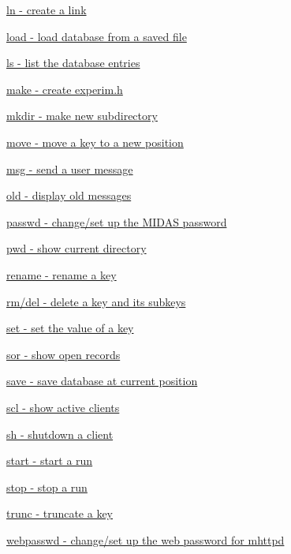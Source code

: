 \begin{DoxyItemize}
\begin{DoxyItemize}
\item \hyperlink{RC_odbedit_examples_RC_odbedit_ln}{ln -\/ create a link} 
\item \hyperlink{RC_odbedit_examples_RC_odbedit_load}{load -\/ load database from a saved file} 
\item \hyperlink{RC_odbedit_examples_RC_odbedit_ls}{ls -\/ list the database entries} 
\item \hyperlink{RC_odbedit_examples_RC_odbedit_make}{make -\/ create experim.h} 
\item \hyperlink{RC_odbedit_examples_RC_odbedit_mkdir}{mkdir -\/ make new subdirectory} 
\item \hyperlink{RC_odbedit_examples_RC_odbedit_move}{move -\/ move a key to a new position} 
\item \hyperlink{RC_odbedit_examples_RC_odbedit_msg}{msg -\/ send a user message} 
\item \hyperlink{RC_odbedit_examples_RC_odbedit_old}{old -\/ display old messages} 
\item \hyperlink{RC_odbedit_examples_RC_odbedit_passwd}{passwd -\/ change/set up the MIDAS password} 
\item \hyperlink{RC_odbedit_examples_RC_odbedit_pwd}{pwd -\/ show current directory} 
\item \hyperlink{RC_odbedit_examples_RC_odbedit_rename}{rename -\/ rename a key} 
\item \hyperlink{RC_odbedit_examples_RC_odbedit_rm}{rm/del -\/ delete a key and its subkeys} 
\item \hyperlink{RC_odbedit_examples_RC_odbedit_set}{set -\/ set the value of a key} 
\item \hyperlink{RC_odbedit_examples_RC_odbedit_sor}{sor -\/ show open records} 
\item \hyperlink{RC_odbedit_examples_RC_odbedit_save}{save -\/ save database at current position} 
\item \hyperlink{RC_odbedit_examples_RC_odbedit_scl}{scl -\/ show active clients} 
\item \hyperlink{RC_odbedit_examples_RC_odbedit_sh}{sh -\/ shutdown a client} 
\item \hyperlink{RC_odbedit_examples_RC_odbedit_start}{start -\/ start a run} 
\item \hyperlink{RC_odbedit_examples_RC_odbedit_stop}{stop -\/ stop a run} 
\item \hyperlink{RC_odbedit_examples_RC_odbedit_trunc}{trunc -\/ truncate a key} 
\item \hyperlink{RC_odbedit_examples_RC_odbedit_webpasswd}{webpasswd -\/ change/set up the web password for mhttpd} 
\end{DoxyItemize}
\end{DoxyItemize}



